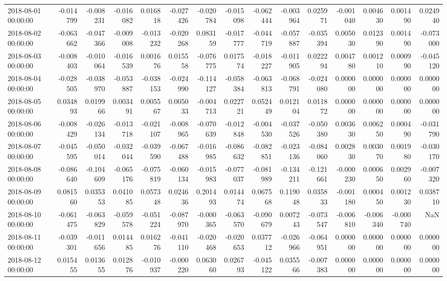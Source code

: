 \begin{tabular}{lrrrrrrrrrrrrrr}
2018-08-01 00:00:00 & -0.014799 & -0.008231 & -0.016082 & 0.016818 & -0.027426 & -0.020784 & -0.015098 & -0.062444 & -0.003964 & 0.025971 & -0.001040 & 0.004630 & 0.001490 & 0.024940 \\
2018-08-02 00:00:00 & -0.063662 & -0.047366 & -0.009008 & -0.013232 & -0.020268 & 0.083159 & -0.017777 & -0.044719 & -0.057887 & -0.035394 & 0.005030 & 0.012390 & 0.001490 & -0.073000 \\
2018-08-03 00:00:00 & -0.008403 & -0.010064 & -0.016539 & 0.001676 & 0.015558 & -0.076775 & 0.017574 & -0.018227 & -0.011905 & 0.022294 & 0.004780 & 0.001210 & 0.000990 & -0.045120 \\
2018-08-04 00:00:00 & -0.028505 & -0.038970 & -0.053887 & -0.038153 & -0.024990 & -0.114127 & -0.058384 & -0.063813 & -0.068791 & -0.024080 & 0.000000 & 0.000000 & 0.000000 & 0.000000 \\
2018-08-05 00:00:00 & 0.034893 & 0.019966 & 0.003491 & 0.005567 & 0.005033 & -0.004713 & 0.022721 & 0.052449 & 0.012104 & 0.011872 & 0.000000 & 0.000000 & 0.000000 & 0.000000 \\
2018-08-06 00:00:00 & -0.008429 & -0.026134 & -0.013718 & -0.021107 & -0.008965 & -0.070639 & -0.012848 & -0.004530 & -0.037526 & -0.050380 & 0.003630 & 0.006250 & 0.000490 & -0.031790 \\
2018-08-07 00:00:00 & -0.045595 & -0.050014 & -0.032044 & -0.039590 & -0.067488 & -0.016985 & -0.086632 & -0.082851 & -0.023136 & -0.084060 & 0.002830 & 0.003070 & 0.001980 & -0.030170 \\
2018-08-08 00:00:00 & -0.086640 & -0.104609 & -0.065176 & -0.075819 & -0.060134 & -0.015983 & -0.077037 & -0.081989 & -0.134211 & -0.121661 & -0.000230 & 0.000650 & 0.002960 & -0.007320 \\
2018-08-09 00:00:00 & 0.081560 & 0.035353 & 0.041085 & 0.057348 & 0.024636 & 0.201493 & 0.014474 & 0.067568 & 0.119048 & 0.035833 & -0.001180 & 0.000450 & 0.001230 & 0.038710 \\
2018-08-10 00:00:00 & -0.061475 & -0.063829 & -0.059578 & -0.051224 & -0.087970 & -0.000365 & -0.063570 & -0.090679 & 0.007243 & -0.073547 & -0.006810 & -0.006340 & -0.000740 & NaN \\
2018-08-11 00:00:00 & -0.039301 & -0.011656 & 0.014485 & 0.016276 & -0.041110 & -0.020468 & -0.020653 & 0.037712 & -0.026966 & -0.064951 & 0.000000 & 0.000000 & 0.000000 & 0.000000 \\
2018-08-12 00:00:00 & 0.015455 & 0.013655 & 0.012876 & -0.010937 & -0.000220 & 0.063060 & 0.026793 & -0.045122 & 0.035566 & -0.007383 & 0.000000 & 0.000000 & 0.000000 & 0.000000 \\

\end{tabular}
